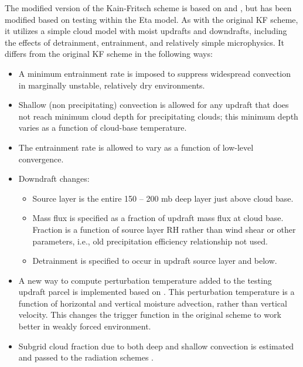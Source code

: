 The modified version of the Kain-Fritsch scheme \citep{kain04} is based on 
\citet{kain90} and \citet{kain93}, but has been modified based on 
testing within the Eta model. As with the original KF scheme, 
it utilizes a simple cloud model with moist updrafts and downdrafts, 
including the effects of detrainment, entrainment, and relatively 
simple microphysics. It differs from the original KF scheme in the following ways:

\begin{itemize}\setlength{\parskip}{-4pt}
\item
 A minimum entrainment rate is imposed to suppress widespread convection 
in marginally unstable, relatively dry environments.

\item
Shallow (non precipitating) convection is allowed for any updraft 
that does not reach minimum cloud depth for precipitating clouds; 
this minimum depth varies as a function of cloud-base temperature.

\item
The entrainment rate is allowed to vary as a function of low-level convergence.

\item
Downdraft changes:

\begin{itemize}\setlength{\parskip}{-4pt}
\item
Source layer is the entire 150 -- 200 mb deep layer just above cloud base.

\item
Mass flux is specified as a fraction of updraft mass flux at cloud base.
Fraction is a function of source layer RH rather than wind shear 
or other parameters, i.e., old precipitation efficiency relationship not used.

\item
Detrainment is specified to occur in updraft source layer and below.
\end{itemize}

\item
A new way to compute perturbation temperature added to the testing updraft 
parcel is implemented based on \citet{ma2009}. This perturbation temperature
is a function of horizontal and vertical moisture advection, rather than vertical
velocity. This changes the trigger function in the original scheme to work better
in weakly forced environment.

\item
Subgrid cloud fraction due to both deep and shallow convection is estimated and passed
to the radiation schemes \citep{alapaty12}.
\end{itemize}

